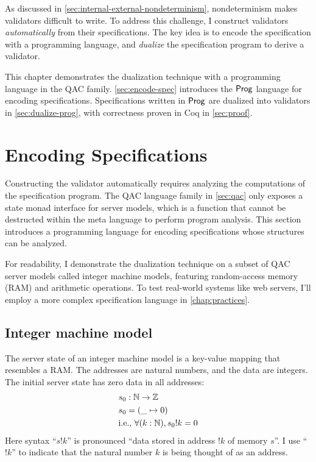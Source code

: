 As discussed in \autoref{sec:internal-external-nondeterminism}, nondeterminism
makes validators difficult to write.  To address this challenge, I construct
validators {\em automatically} from their specifications.  The key idea is to
encode the specification with a programming language, and {\em dualize} the
specification program to derive a validator.

This chapter demonstrates the dualization technique with a programming language
in the QAC family.  \autoref{sec:encode-spec} introduces the $\mathsf{Prog}$ language
for encoding specifications.  Specifications written in $\mathsf{Prog}$ are dualized
into validators in \autoref{sec:dualize-prog}, with correctness proven in Coq
in \autoref{sec:proof}.

\section{Encoding Specifications}
\label{sec:encode-spec}
Constructing the validator automatically requires analyzing the computations of
the specification program.  The QAC language family in \autoref{sec:qac} only
exposes a state monad interface for server models, which is a function that
cannot be destructed within the meta language to perform program analysis.  This
section introduces a programming language for encoding specifications whose
structures can be analyzed.

For readability, I demonstrate the dualization technique on a subset of QAC
server models called integer machine models, featuring random-access memory (RAM)
and arithmetic operations.  To test real-world systems like web servers, I'll
employ a more complex specification language in \autoref{chap:practices}.

\subsection{Integer machine model}
The server state of an integer machine model is a key-value mapping that
resembles a RAM.  The addresses are natural numbers, and the data are integers.
The initial server state has zero data in all addresses:
\begin{align*}
  &s_0:\mathbb N\to\mathbb Z\\
  &s_0=(\_\mapsto0)\\
  &\text{i.e.}\text{, }\forall (k:\mathbb N), s_0!k=0
\end{align*}
Here syntax ``$s!k$'' is pronounced ``data stored in address $!k$ of memory
$s$''.  I use ``$!k$'' to indicate that the natural number $k$ is being thought
of as an address.

